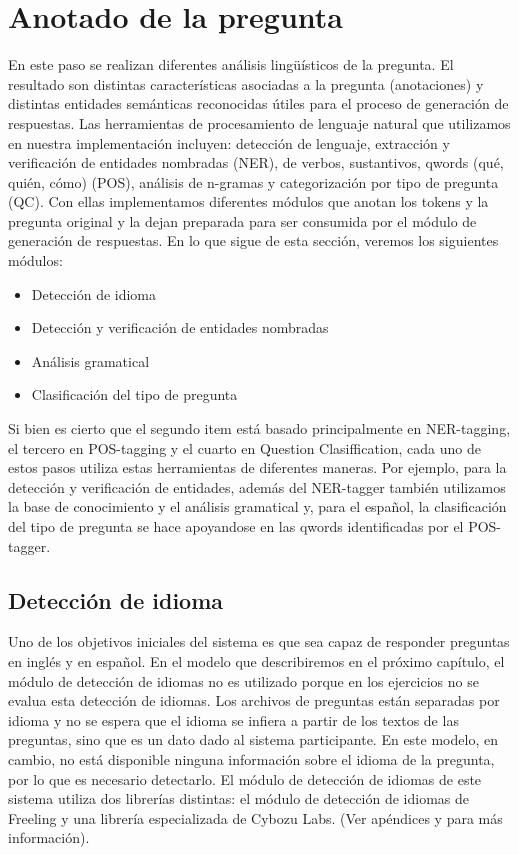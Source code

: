 \section{Anotado de la pregunta}
\label{sec:qp-mitic}

En este paso se realizan diferentes análisis lingüísticos de la pregunta. El resultado son distintas características asociadas a la pregunta (anotaciones) y distintas entidades semánticas reconocidas útiles para el proceso de generación de respuestas. 
Las herramientas de procesamiento de lenguaje natural que utilizamos en nuestra implementación incluyen: detección de lenguaje, extracción y verificación de entidades nombradas (NER), de verbos, sustantivos, qwords (qué, quién, cómo) (POS), análisis de n-gramas y categorización por tipo de pregunta (QC).
Con ellas implementamos diferentes módulos que anotan los tokens y la pregunta original y la dejan preparada para ser consumida por el módulo de generación de respuestas. En lo que sigue de esta sección, veremos los siguientes módulos:

\begin{itemize}
\item Detección de idioma 
\item Detección y verificación de entidades nombradas
\item Análisis gramatical
\item Clasificación del tipo de pregunta
\end{itemize}

Si bien es cierto que el segundo item está basado principalmente en NER-tagging, el tercero en POS-tagging y el cuarto en Question Clasiffication, 
cada uno de estos pasos utiliza estas herramientas de diferentes maneras. Por ejemplo, para la detección y verificación de entidades, además del NER-tagger también utilizamos la base de conocimiento y el análisis gramatical y, para el español, la clasificación del tipo de pregunta se hace apoyandose en las qwords identificadas por el POS-tagger.

\subsection{Detección de idioma}

Uno de los objetivos iniciales del sistema es que sea capaz de responder preguntas en inglés y en español. En el modelo que describiremos en el próximo capítulo, el módulo de detección de idiomas no es utilizado porque en los ejercicios no se evalua esta detección de idiomas. Los archivos de preguntas están separadas por idioma y no se espera que el idioma se infiera a partir de los textos de las preguntas, sino que es un dato dado al sistema participante. En este modelo, en cambio, no está disponible ninguna información sobre el idioma de la pregunta, por lo que es necesario detectarlo. El módulo de detección de idiomas de este sistema utiliza dos librerías distintas: el módulo de detección de idiomas de Freeling y una librería especializada de Cybozu Labs. (Ver apéndices  y  para más información).

